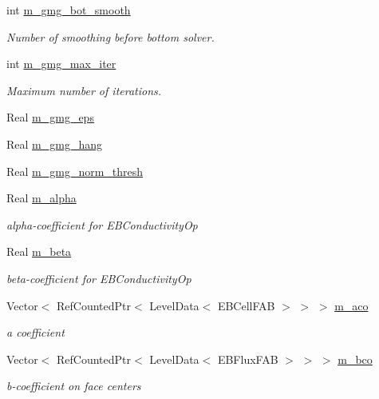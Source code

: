 \begin{DoxyCompactItemize}
int \hyperlink{classpoisson__staircase__gmg_ab2e0db3c965eed182c0ad088786a7100}{m\+\_\+gmg\+\_\+bot\+\_\+smooth}
\begin{DoxyCompactList}\small\item\em Number of smoothing before bottom solver. \end{DoxyCompactList}\item 
int \hyperlink{classpoisson__staircase__gmg_afedb31be654bbc19fa7c3777cf840b5d}{m\+\_\+gmg\+\_\+max\+\_\+iter}
\begin{DoxyCompactList}\small\item\em Maximum number of iterations. \end{DoxyCompactList}\item 
Real \hyperlink{classpoisson__staircase__gmg_a59be10814772bb99a719f46267d25f67}{m\+\_\+gmg\+\_\+eps}
\item 
Real \hyperlink{classpoisson__staircase__gmg_aa02bed6a84cff8c4de9f5d957b7973ef}{m\+\_\+gmg\+\_\+hang}
\item 
Real \hyperlink{classpoisson__staircase__gmg_a11491c446a1b7d03132a1235e159c273}{m\+\_\+gmg\+\_\+norm\+\_\+thresh}
\item 
Real \hyperlink{classpoisson__staircase__gmg_a693bc415824ca16c316da68a5d49e908}{m\+\_\+alpha}
\begin{DoxyCompactList}\small\item\em alpha-\/coefficient for E\+B\+Conductivity\+Op \end{DoxyCompactList}\item 
Real \hyperlink{classpoisson__staircase__gmg_ad371381d12898451a9e71b71211c44a4}{m\+\_\+beta}
\begin{DoxyCompactList}\small\item\em beta-\/coefficient for E\+B\+Conductivity\+Op \end{DoxyCompactList}\item 
Vector$<$ Ref\+Counted\+Ptr$<$ Level\+Data$<$ E\+B\+Cell\+F\+AB $>$ $>$ $>$ \hyperlink{classpoisson__staircase__gmg_ad6ec5c9ecaa6f9c1e1ccbae02edc0eae}{m\+\_\+aco}
\begin{DoxyCompactList}\small\item\em a coefficient \end{DoxyCompactList}\item 
Vector$<$ Ref\+Counted\+Ptr$<$ Level\+Data$<$ E\+B\+Flux\+F\+AB $>$ $>$ $>$ \hyperlink{classpoisson__staircase__gmg_a9e2cb700c8b327765f39297acad466c8}{m\+\_\+bco}
\begin{DoxyCompactList}\small\item\em b-\/coefficient on face centers \end{DoxyCompactList}\item 

\end{DoxyCompactItemize}
